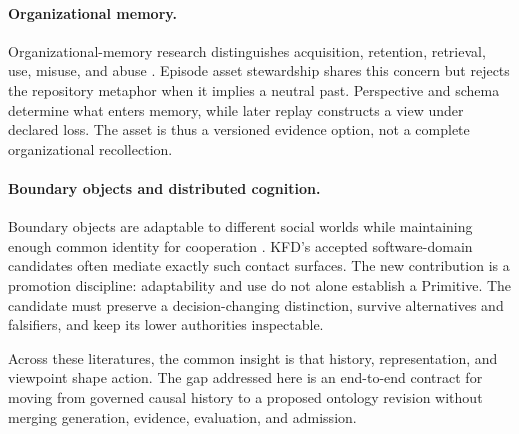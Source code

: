 \paragraph{Organizational memory.}
Organizational-memory research distinguishes acquisition, retention,
retrieval, use, misuse, and abuse \cite{walsh1991memory}. Episode asset
stewardship shares this concern but rejects the repository metaphor when it
implies a neutral past. Perspective and schema determine what enters memory,
while later replay constructs a view under declared loss. The asset is thus a
versioned evidence option, not a complete organizational recollection.

\paragraph{Boundary objects and distributed cognition.}
Boundary objects are adaptable to different social worlds while maintaining
enough common identity for cooperation \cite{star1989boundary}. KFD's accepted
software-domain candidates often mediate exactly such contact surfaces. The
new contribution is a promotion discipline: adaptability and use do not alone
establish a Primitive. The candidate must preserve a decision-changing
distinction, survive alternatives and falsifiers, and keep its lower
authorities inspectable.

Across these literatures, the common insight is that history, representation,
and viewpoint shape action. The gap addressed here is an end-to-end contract
for moving from governed causal history to a proposed ontology revision
without merging generation, evidence, evaluation, and admission.
